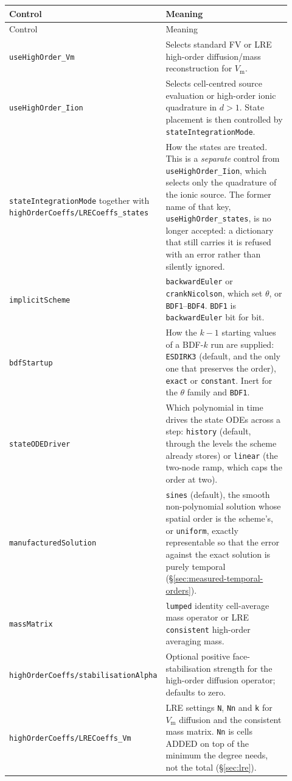 \documentclass[11pt,a4paper]{article}
\newcommand{\code}[1]{\texttt{\small #1}}
\newcommand{\Vm}{V_{\text{m}}}
\begin{document}
\begin{longtable}{@{}p{0.34\linewidth}p{0.58\linewidth}@{}}
\toprule
Control & Meaning \\
\midrule
\endfirsthead
\toprule
Control & Meaning \\
\midrule
\endhead
\code{useHighOrder\_Vm} & Selects standard FV or LRE high-order diffusion/mass reconstruction for $\Vm$. \\
\code{useHighOrder\_Iion} & Selects cell-centred source evaluation or high-order ionic quadrature in $d>1$. State placement is then controlled by \code{stateIntegrationMode}. \\
\code{stateIntegrationMode} together with \code{highOrderCoeffs/LRECoeffs\_states} & How the states are treated. This is a \emph{separate} control from \code{useHighOrder\_Iion}, which selects only the quadrature of the ionic source. The former name of that key, \code{useHighOrder\_states}, is no longer accepted: a dictionary that still carries it is refused with an error rather than silently ignored. \\
\code{implicitScheme} & \code{backwardEuler} or \code{crankNicolson}, which set $\theta$, or \code{BDF1}--\code{BDF4}. \code{BDF1} is \code{backwardEuler} bit for bit. \\
\code{bdfStartup} & How the $k-1$ starting values of a BDF-$k$ run are supplied: \code{ESDIRK3} (default, and the only one that preserves the order), \code{exact} or \code{constant}. Inert for the $\theta$ family and \code{BDF1}. \\
\code{stateODEDriver} & Which polynomial in time drives the state ODEs across a step: \code{history} (default, through the levels the scheme already stores) or \code{linear} (the two-node ramp, which caps the order at two). \\
\code{manufacturedSolution} & \code{sines} (default), the smooth non-polynomial solution whose spatial order is the scheme's, or \code{uniform}, exactly representable so that the error against the exact solution is purely temporal (\S\ref{sec:measured-temporal-orders}). \\
\code{massMatrix} & \code{lumped} identity cell-average mass operator or LRE \code{consistent} high-order averaging mass. \\
\code{highOrderCoeffs/stabilisationAlpha} & Optional positive face-stabilisation strength for the high-order diffusion operator; defaults to zero. \\
\code{highOrderCoeffs/LRECoeffs\_Vm} & LRE settings \code{N}, \code{Nn} and \code{k} for $\Vm$ diffusion and the consistent mass matrix. \code{Nn} is cells ADDED on top of the minimum the degree needs, not the total (\S\ref{sec:lre}). \\

\end{longtable}
\end{document}
